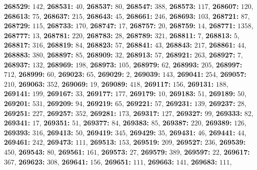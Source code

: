 \textsf{\bfseries 268529:} $142$, \textsf{\bfseries 268531:} $40$, \textsf{\bfseries 268537:} $80$, \textsf{\bfseries 268547:} $388$, \textsf{\bfseries 268573:} $117$, \textsf{\bfseries 268607:} $120$, \textsf{\bfseries 268613:} $75$, \textsf{\bfseries 268637:} $215$, \textsf{\bfseries 268643:} $45$, \textsf{\bfseries 268661:} $246$, \textsf{\bfseries 268693:} $103$, \textsf{\bfseries 268721:} $87$, \textsf{\bfseries 268729:} $115$, \textsf{\bfseries 268733:} $170$, \textsf{\bfseries 268747:} $17$, \textsf{\bfseries 268757:} $20$, \textsf{\bfseries 268759:} $14$, \textsf{\bfseries 268771:} $1358$, \textsf{\bfseries 268777:} $13$, \textsf{\bfseries 268781:} $220$, \textsf{\bfseries 268783:} $28$, \textsf{\bfseries 268789:} $321$, \textsf{\bfseries 268811:} $7$, \textsf{\bfseries 268813:} $5$, \textsf{\bfseries 268817:} $316$, \textsf{\bfseries 268819:} $84$, \textsf{\bfseries 268823:} $57$, \textsf{\bfseries 268841:} $43$, \textsf{\bfseries 268843:} $217$, \textsf{\bfseries 268861:} $44$, \textsf{\bfseries 268883:} $380$, \textsf{\bfseries 268897:} $85$, \textsf{\bfseries 268909:} $32$, \textsf{\bfseries 268913:} $57$, \textsf{\bfseries 268921:} $263$, \textsf{\bfseries 268927:} $7$, \textsf{\bfseries 268937:} $132$, \textsf{\bfseries 268969:} $198$, \textsf{\bfseries 268973:} $105$, \textsf{\bfseries 268979:} $62$, \textsf{\bfseries 268993:} $205$, \textsf{\bfseries 268997:} $712$, \textsf{\bfseries 268999:} $60$, \textsf{\bfseries 269023:} $65$, \textsf{\bfseries 269029:} $2$, \textsf{\bfseries 269039:} $143$, \textsf{\bfseries 269041:} $254$, \textsf{\bfseries 269057:} $210$, \textsf{\bfseries 269063:} $352$, \textsf{\bfseries 269069:} $19$, \textsf{\bfseries 269089:} $418$, \textsf{\bfseries 269117:} $156$, \textsf{\bfseries 269131:} $188$, \textsf{\bfseries 269141:} $199$, \textsf{\bfseries 269167:} $33$, \textsf{\bfseries 269177:} $177$, \textsf{\bfseries 269179:} $10$, \textsf{\bfseries 269183:} $51$, \textsf{\bfseries 269189:} $50$, \textsf{\bfseries 269201:} $531$, \textsf{\bfseries 269209:} $94$, \textsf{\bfseries 269219:} $65$, \textsf{\bfseries 269221:} $57$, \textsf{\bfseries 269231:} $139$, \textsf{\bfseries 269237:} $28$, \textsf{\bfseries 269251:} $227$, \textsf{\bfseries 269257:} $352$, \textsf{\bfseries 269281:} $173$, \textsf{\bfseries 269317:} $127$, \textsf{\bfseries 269327:} $99$, \textsf{\bfseries 269333:} $82$, \textsf{\bfseries 269341:} $17$, \textsf{\bfseries 269351:} $51$, \textsf{\bfseries 269377:} $84$, \textsf{\bfseries 269383:} $85$, \textsf{\bfseries 269387:} $220$, \textsf{\bfseries 269389:} $126$, \textsf{\bfseries 269393:} $316$, \textsf{\bfseries 269413:} $50$, \textsf{\bfseries 269419:} $345$, \textsf{\bfseries 269429:} $35$, \textsf{\bfseries 269431:} $46$, \textsf{\bfseries 269441:} $44$, \textsf{\bfseries 269461:} $242$, \textsf{\bfseries 269473:} $111$, \textsf{\bfseries 269513:} $153$, \textsf{\bfseries 269519:} $209$, \textsf{\bfseries 269527:} $236$, \textsf{\bfseries 269539:} $450$, \textsf{\bfseries 269543:} $80$, \textsf{\bfseries 269561:} $161$, \textsf{\bfseries 269573:} $27$, \textsf{\bfseries 269579:} $389$, \textsf{\bfseries 269597:} $22$, \textsf{\bfseries 269617:} $367$, \textsf{\bfseries 269623:} $308$, \textsf{\bfseries 269641:} $156$, \textsf{\bfseries 269651:} $111$, \textsf{\bfseries 269663:} $141$, \textsf{\bfseries 269683:} $111$, 
